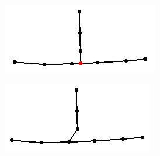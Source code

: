 \documentclass[11pt]{article}
\begin{document}
\begin{figure}[h]
\centering
  \begin{subfigure}{0.4\linewidth}
  \centering
  \graphicspath{ {images/}}
  \includegraphics[width=\linewidth]{test1165_170}
  \end{subfigure}
    \begin{subfigure}{0.4\linewidth}
  \centering
  \graphicspath{ {images/}}
  \includegraphics[width=\linewidth]{test1140_170}
  \end{subfigure}
\end{figure}
\end{document}
